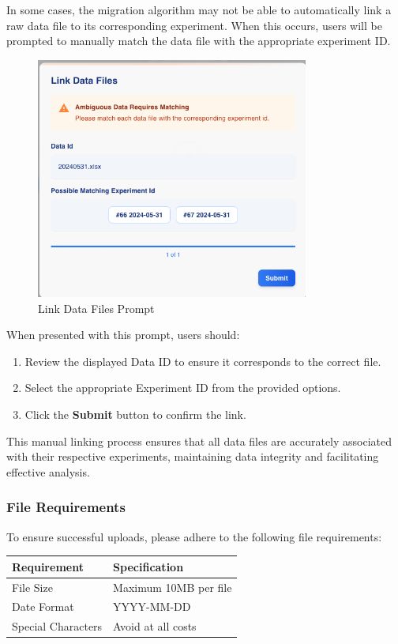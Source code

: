 \documentclass[12pt]{article}
\begin{document}
In some cases, the migration algorithm may not be able to automatically link a
raw data file to its corresponding experiment. When this occurs, users will be
prompted to manually match the data file with the appropriate experiment ID.

\begin{figure}[H]
    \centering
    \includegraphics[width=0.8\textwidth]{./Diagrams/DataLinkModal.png}
    \caption{Link Data Files Prompt}
\end{figure}

When presented with this prompt, users should:

\begin{enumerate}
    \item Review the displayed Data ID to ensure it corresponds to the correct
    file.
    \item Select the appropriate Experiment ID from the provided options.
    \item Click the \textbf{Submit} button to confirm the link.
\end{enumerate}

This manual linking process ensures that all data files are accurately
associated with their respective experiments, maintaining data integrity and
facilitating effective analysis.

\subsubsection{File Requirements}
To ensure successful uploads, please adhere to the following file requirements:
\begin{table}[H]
    \centering
    \begin{tabularx}{\textwidth}{lX}
        \toprule
        \textbf{Requirement} & \textbf{Specification} \\
        \midrule
        File Size & Maximum 10MB per file \\
        Date Format & YYYY-MM-DD \\
        Special Characters & Avoid at all costs \\
        \bottomrule
    \end{tabularx}
\end{table}
\end{document}
